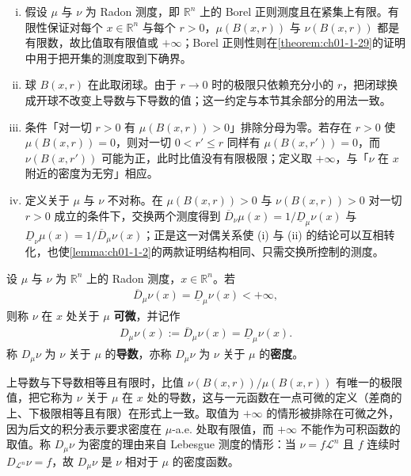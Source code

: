 \documentclass[../../main.tex]{subfiles}%
\begin{document}
\begin{remark}\label{remark:ch01-def-1-20-条件}
\begin{enumerate}[(i)]
\item 假设 $\mu$ 与 $\nu$ 为 Radon 测度，即 $\mathbb{R}^n$ 上的 Borel 正则测度且在紧集上有限。有限性保证对每个 $x\in\mathbb{R}^n$ 与每个 $r>0$，$\mu(B(x,r))$ 与 $\nu(B(x,r))$ 都是有限数，故比值取有限值或 $+\infty$；Borel 正则性则在\cref{theorem:ch01-1-29}的证明中用于把开集的测度取到下确界。%
\item 球 $B(x,r)$ 在此取闭球。由于 $r\to0$ 时的极限只依赖充分小的 $r$，把闭球换成开球不改变上导数与下导数的值；这一约定与本节其余部分的用法一致。
\item 条件「对一切 $r>0$ 有 $\mu(B(x,r))>0$」排除分母为零。若存在 $r>0$ 使 $\mu(B(x,r))=0$，则对一切 $0<r'\leqslant r$ 同样有 $\mu(B(x,r'))=0$，而 $\nu(B(x,r'))$ 可能为正，此时比值没有有限极限；定义取 $+\infty$，与「$\nu$ 在 $x$ 附近的密度为无穷」相应。
\item 定义关于 $\mu$ 与 $\nu$ 不对称。在 $\mu(B(x,r))>0$ 与 $\nu(B(x,r))>0$ 对一切 $r>0$ 成立的条件下，交换两个测度得到 $\overline{D}_{\nu}\mu(x)=1/\underline{D}_{\mu}\nu(x)$ 与 $\underline{D}_{\nu}\mu(x)=1/\overline{D}_{\mu}\nu(x)$；正是这一对偶关系使 (i) 与 (ii) 的结论可以互相转化，也使\cref{lemma:ch01-1-2}的两款证明结构相同、只需交换所控制的测度。%
\end{enumerate}
\end{remark}

\begin{definition}\label{definition:ch01-1-21}
设 $\mu$ 与 $\nu$ 为 $\mathbb{R}^n$ 上的 Radon 测度，$x\in\mathbb{R}^n$。若
\begin{align*}
\overline{D}_{\mu}\nu(x)=\underline{D}_{\mu}\nu(x)<+\infty,
\end{align*}
则称 $\nu$ 在 $x$ 处关于 $\mu$ \textbf{可微}，并记作
\begin{align*}
D_{\mu}\nu(x):=\overline{D}_{\mu}\nu(x)=\underline{D}_{\mu}\nu(x).
\end{align*}
称 $D_{\mu}\nu$ 为 $\nu$ 关于 $\mu$ 的\textbf{导数}，亦称 $D_{\mu}\nu$ 为 $\nu$ 关于 $\mu$ 的\textbf{密度}。
\end{definition}

\begin{remark}\label{remark:ch01-def-1-21-动机}
上导数与下导数相等且有限时，比值 $\nu(B(x,r))/\mu(B(x,r))$ 有唯一的极限值，把它称为 $\nu$ 关于 $\mu$ 在 $x$ 处的导数，这与一元函数在一点可微的定义（差商的上、下极限相等且有限）在形式上一致。取值为 $+\infty$ 的情形被排除在可微之外，因为后文的积分表示要求密度在 $\mu$-a.e. 处取有限值，而 $+\infty$ 不能作为可积函数的取值。称 $D_{\mu}\nu$ 为密度的理由来自 Lebesgue 测度的情形：当 $\nu=f\mathcal{L}^n$ 且 $f$ 连续时 $D_{\mathcal{L}^n}\nu=f$，故 $D_{\mu}\nu$ 是 $\nu$ 相对于 $\mu$ 的密度函数。
\end{remark}
\end{document}
